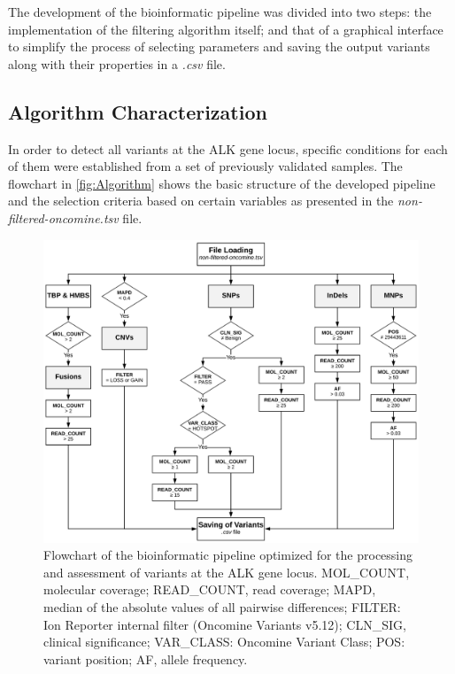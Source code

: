 The development of the bioinformatic pipeline was divided into two steps: the implementation of the filtering algorithm itself; and that of a graphical interface to simplify the process of selecting parameters and saving the output variants along with their properties in a \textit{.csv} file.

\subsection{Algorithm Characterization}

In order to detect all variants at the ALK gene locus, specific conditions for each of them were established from a set of previously validated samples. The flowchart in \autoref{fig:Algorithm} shows the basic structure of the developed pipeline and the selection criteria based on certain variables as presented in the \textit{non-filtered-oncomine.tsv} file.

\begin{figure}[ht]
    \centering
    \includegraphics[width=\textwidth]{Images/chapter_4/mut_filtering.png}
    \caption{Flowchart of the bioinformatic pipeline optimized for the processing and assessment of variants at the ALK gene locus. MOL\_COUNT, molecular coverage; READ\_COUNT, read coverage; MAPD, median of the absolute values of all pairwise differences; FILTER: Ion Reporter\texttrademark{} internal filter (Oncomine\texttrademark{} Variants v5.12); CLN\_SIG, clinical significance; VAR\_CLASS: Oncomine\texttrademark{} Variant Class; POS: variant position; AF, allele frequency.}
    \label{fig:Algorithm}
\end{figure}

